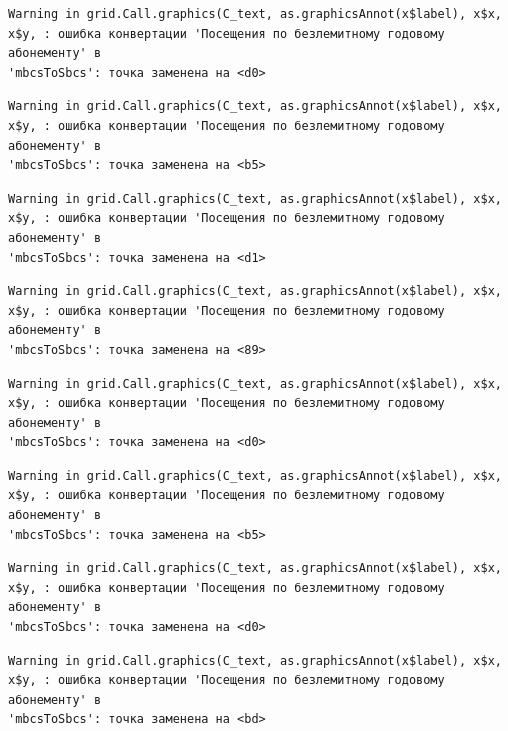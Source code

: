\documentclass[
  letterpaper,
  DIV=11,
  numbers=noendperiod]{scrreprt}
\begin{document}
\begin{verbatim}
Warning in grid.Call.graphics(C_text, as.graphicsAnnot(x$label), x$x,
x$y, : ошибка конвертации 'Посещения по безлемитному годовому абонементу' в
'mbcsToSbcs': точка заменена на <d0>
\end{verbatim}

\begin{verbatim}
Warning in grid.Call.graphics(C_text, as.graphicsAnnot(x$label), x$x,
x$y, : ошибка конвертации 'Посещения по безлемитному годовому абонементу' в
'mbcsToSbcs': точка заменена на <b5>
\end{verbatim}

\begin{verbatim}
Warning in grid.Call.graphics(C_text, as.graphicsAnnot(x$label), x$x,
x$y, : ошибка конвертации 'Посещения по безлемитному годовому абонементу' в
'mbcsToSbcs': точка заменена на <d1>
\end{verbatim}

\begin{verbatim}
Warning in grid.Call.graphics(C_text, as.graphicsAnnot(x$label), x$x,
x$y, : ошибка конвертации 'Посещения по безлемитному годовому абонементу' в
'mbcsToSbcs': точка заменена на <89>
\end{verbatim}

\begin{verbatim}
Warning in grid.Call.graphics(C_text, as.graphicsAnnot(x$label), x$x,
x$y, : ошибка конвертации 'Посещения по безлемитному годовому абонементу' в
'mbcsToSbcs': точка заменена на <d0>
\end{verbatim}

\begin{verbatim}
Warning in grid.Call.graphics(C_text, as.graphicsAnnot(x$label), x$x,
x$y, : ошибка конвертации 'Посещения по безлемитному годовому абонементу' в
'mbcsToSbcs': точка заменена на <b5>
\end{verbatim}

\begin{verbatim}
Warning in grid.Call.graphics(C_text, as.graphicsAnnot(x$label), x$x,
x$y, : ошибка конвертации 'Посещения по безлемитному годовому абонементу' в
'mbcsToSbcs': точка заменена на <d0>
\end{verbatim}

\begin{verbatim}
Warning in grid.Call.graphics(C_text, as.graphicsAnnot(x$label), x$x,
x$y, : ошибка конвертации 'Посещения по безлемитному годовому абонементу' в
'mbcsToSbcs': точка заменена на <bd>
\end{verbatim}
\end{document}
